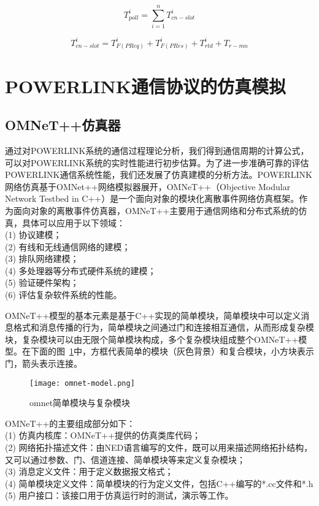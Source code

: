 \begin{equation}
\label{equation13}
T_{poll}^{i}=\sum_{i=1}^nT_{cn-slot}^{i}
\end{equation}

\begin{equation}
\label{equation14}
T_{cn-slot}^{i}=T_{F(PReq)}^{i}+T_{F(PRes)}^{i}+T_{rtd}^{i}+T_{r-mn}
\end{equation}

\section{POWERLINK通信协议的仿真模拟}
\label{section:仿真模拟POWERLINK通信协议}

\subsection{OMNeT++仿真器}
通过对POWERLINK系统的通信过程理论分析，我们得到通信周期的计算公式，可以对POWERLINK系统的实时性能进行初步估算。为了进一步准确可靠的评估POWERLINK通信系统性能，我们还发展了仿真建模的分析方法。POWERLINK网络仿真基于OMNet++网络模拟器展开，OMNeT++（Objective Modular Network Testbed in C++）是一个面向对象的模块化离散事件网络仿真框架\cite{omnet}。作为面向对象的离散事件仿真器，OMNeT++主要用于通信网络和分布式系统的仿真，具体可以应用于以下领域\cite{gao2015,xu2014,liu2015}：\\
(1) 协议建模；\\
(2) 有线和无线通信网络的建模；\\
(3) 排队网络建模；\\
(4) 多处理器等分布式硬件系统的建模；\\
(5) 验证硬件架构；\\
(6) 评估复杂软件系统的性能。

OMNeT++模型的基本元素是基于C++实现的简单模块，简单模块中可以定义消息格式和消息传播的行为，简单模块之间通过门和连接相互通信，从而形成复杂模块，复杂模块可以由无限个简单模块构成，多个复杂模块组成整个OMNeT++模型。在下面的图~\ref{fig:omnet-model}中，方框代表简单的模块（灰色背景）和复合模块，小方块表示门，箭头表示连接\cite{wu2006}。
\begin{figure}[!htb]
  \centering
  \texttt{[image: omnet-model.png]}
  \caption{omnet简单模块与复杂模块}
  \label{fig:omnet-model}
\end{figure}

OMNeT++的主要组成部分如下：\\
(1) 仿真内核库：OMNeT++提供的仿真类库代码；\\
(2) 网络拓扑描述文件：由NED语言编写的文件，既可以用来描述网络拓扑结构，又可以通过参数、门、信道连接、简单模块等来定义复杂模块；\\
(3) 消息定义文件：用于定义数据报文格式；\\
(4) 简单模块定义文件：简单模块的行为定义文件，包括C++编写的*.cc文件和*.h\\
(5) 用户接口：该接口用于仿真运行时的测试，演示等工作。

